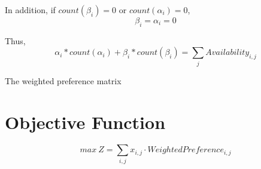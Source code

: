 In addition, if $count(\beta_{i})=0$ or $count(\alpha_{i})=0$,
$$ \beta_{i} = \alpha_{i} = 0 $$ 

Thus, 
$$ \alpha_{i}*count(\alpha_{i}) +\beta_{i} * count(\beta_{i}) = \sum\limits_{j}Availability_{i,j}$$

The weighted preference matrix 



\section{Objective Function}

$$ max~Z = \sum\limits_{i,j} x_{i,j} \cdot WeightedPreference_{i,j}$$


